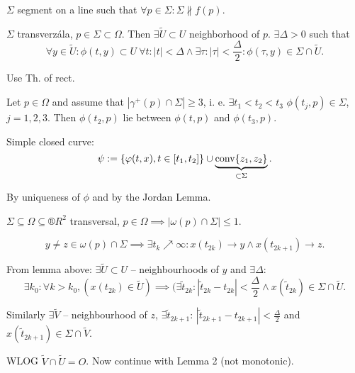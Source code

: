 \documentclass[12pt]{article}					%
\begin{document}
\begin{definice}[Transverzála]
	$\Sigma$ segment on a line such that $\forall p \in \Sigma: \Sigma \not\parallel f(p)$.
\end{definice}

\begin{lemma}
	$\Sigma$ transverzála, $p \in \Sigma \subset \Omega$. Then $\exists \tilde U \subset U$ neighborhood of $p$. $\exists \Delta > 0$ such that
	$$ \forall y \in \tilde U: \phi(t, y) \subset U\ \forall t: |t| < \Delta \land \exists \tau: |\tau| < \frac{\Delta}{2}: \phi(\tau, y) \in \Sigma \cap \tilde U. $$

	\begin{dukazin}
		Use Th. of rect.
	\end{dukazin}
\end{lemma}

\begin{lemma}
	Let $p \in \Omega$ and assume that $|\gamma^+(p) \cap \Sigma| ≥ 3$, i. e. $\exists t_1 < t_2 < t_3$ $\phi(t_j, p) \in \Sigma$, $j=1, 2, 3$. Then $\phi(t_2, p)$ lie between $\phi(t, p)$ and $\phi(t_3, p)$.


	\begin{dukazin}
		Simple closed curve:
		$$ \psi := \{\varphi(t, x), t \in [t_1, t_2]\} \cup \underbrace{\operatorname{conv}\{z_1, z_2\}}_{\subset \Sigma}. $$

		By uniqueness of $\phi$ and by the Jordan Lemma.
	\end{dukazin}
\end{lemma}

\begin{lemma}
	$\Sigma \subseteq \Omega \subseteq ®R^2$ transversal, $p \in \Omega \implies |\omega(p) \cap \Sigma| ≤ 1$.

	\begin{dukazin}
		$$ y ≠ z \in \omega(p) \cap \Sigma \implies \exists t_k \nearrow ∞: x(t_{2k}) \rightarrow y \land x(t_{2k + 1}) \rightarrow z. $$

		From lemma above: $\exists \tilde U \subset U$ – neighbourhoods of $y$ and $\exists \Delta$:
		$$ \exists k_0: \forall k > k_0, (x(t_{2k}) \in \tilde U) \implies (\exists \tilde t_{2k}: |\tilde t_{2k} - t_{2k}| < \frac{\Delta}{2} \land x(\tilde t_{2k}) \in \Sigma \cap \tilde U. $$

		Similarly $\exists \tilde V$ – neighbourhood of $z$, $\exists \tilde t_{2k+1}$: $|\tilde t_{2k+1} - t_{2k+1}| < \frac{\Delta}{2}$ and $x(\tilde t_{2k+1}) \in \Sigma \cap \tilde V$.

		WLOG $\tilde V \cap \tilde U = O$. Now continue with Lemma 2 (not monotonic).
	\end{dukazin}
\end{lemma}
\end{document}
